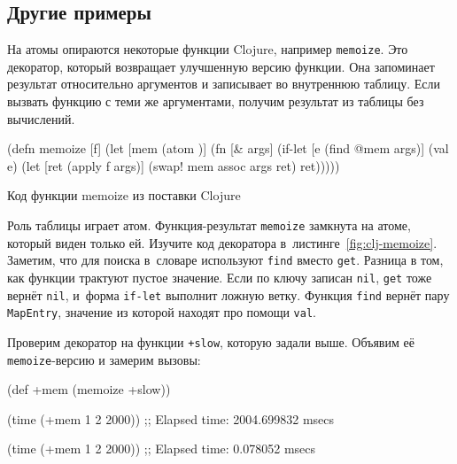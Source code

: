 \subsection{Другие примеры}


На атомы опираются некоторые функции Clojure, например \verb|memoize|. Это
декоратор, который возвращает улучшенную версию функции. Она запоминает
результат относительно аргументов и записывает во внутреннюю таблицу. Если
вызвать функцию с теми же аргументами, получим результат из таблицы без
вычислений.

\begin{listing}[ht!]
  \small

\begin{english}
  \begin{clojure}
(defn memoize [f]
  (let [mem (atom {})]
    (fn [& args]
      (if-let [e (find @mem args)]
        (val e)
        (let [ret (apply f args)]
          (swap! mem assoc args ret)
          ret)))))
  \end{clojure}
\end{english}

\caption{Код функции memoize из поставки Clojure}
\label{fig:clj-memoize}

\end{listing}


Роль таблицы играет атом. Функция-результат \verb|memoize| замкнута на атоме,
который виден только ей. Изучите код декоратора
в~листинге~\ref{fig:clj-memoize}. Заметим, что для поиска в~словаре используют
\verb|find| вместо \verb|get|. Разница в том, как функции трактуют пустое
значение. Если по ключу записан \verb|nil|, \verb|get| тоже вернёт \verb|nil|,
и~форма \verb|if-let| выполнит ложную ветку. Функция \verb|find| вернёт пару
\verb|MapEntry|, значение из которой находят про помощи \verb|val|.

Проверим декоратор на функции \verb|+slow|, которую задали выше. Объявим её
\verb|memoize|-версию и замерим вызовы:

\begin{english}
  \begin{clojure}
(def +mem (memoize +slow))

(time (+mem 1 2 2000))
;; Elapsed time: 2004.699832 msecs

(time (+mem 1 2 2000))
;; Elapsed time: 0.078052 msecs
  \end{clojure}
\end{english}

